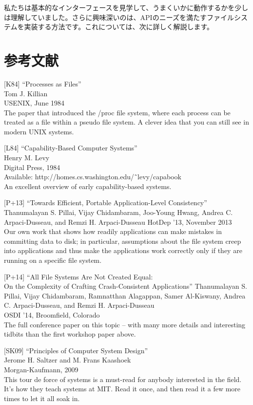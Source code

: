 私たちは基本的なインターフェースを見学して、うまくいかに動作するかを少しは理解していました。さらに興味深いのは、APIのニーズを満たすファイルシステムを実装する方法です。これについては、次に詳しく解説します。

\hypertarget{ux53c2ux8003ux6587ux732e-26}{%
\section*{参考文献}\label{ux53c2ux8003ux6587ux732e-26}}

{[}K84{]} ``Processes as Files''\\
Tom J. Killian\\
USENIX, June 1984\\
The paper that introduced the /proc file system, where each process can
be treated as a file within a pseudo file system. A clever idea that you
can still see in modern UNIX systems.

{[}L84{]} ``Capability-Based Computer Systems''\\
Henry M. Levy\\
Digital Press, 1984\\
Available: http://homes.cs.washington.edu/˜levy/capabook\\
An excellent overview of early capability-based systems.

{[}P+13{]} ``Towards Efficient, Portable Application-Level
Consistency''\\
Thanumalayan S. Pillai, Vijay Chidambaram, Joo-Young Hwang, Andrea C.
Arpaci-Dusseau, and Remzi H. Arpaci-Dusseau HotDep '13, November 2013\\
Our own work that shows how readily applications can make mistakes in
committing data to disk; in particular, assumptions about the file
system creep into applications and thus make the applications work
correctly only if they are running on a specific file system.

{[}P+14{]} ``All File Systems Are Not Created Equal:\\
On the Complexity of Crafting Crash-Consistent Applications''
Thanumalayan S. Pillai, Vijay Chidambaram, Ramnatthan Alagappan, Samer
Al-Kiswany, Andrea C. Arpaci-Dusseau, and Remzi H. Arpaci-Dusseau\\
OSDI '14, Broomfield, Colorado\\
The full conference paper on this topic -- with many more details and
interesting tidbits than the first workshop paper above.

{[}SK09{]} ``Principles of Computer System Design''\\
Jerome H. Saltzer and M. Frans Kaashoek\\
Morgan-Kaufmann, 2009\\
This tour de force of systems is a must-read for anybody interested in
the field. It's how they teach systems at MIT. Read it once, and then
read it a few more times to let it all soak in.

